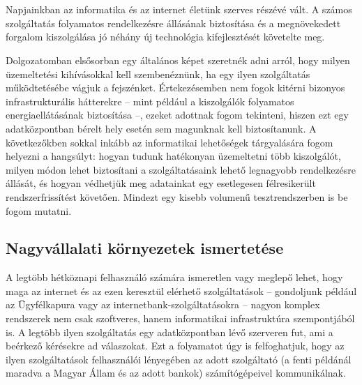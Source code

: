 \chapter{\bevezetes}

%

Napjainkban az informatika és az internet életünk szerves részévé vált. A számos szolgáltatás folyamatos rendelkezésre állásának biztosítása és a megnövekedett forgalom kiszolgálása jó néhány új technológia kifejlesztését követelte meg.

Dolgozatomban elsősorban egy általános képet szeretnék adni arról, hogy milyen üzemeltetési kihívásokkal kell szembenéznünk, ha egy ilyen szolgáltatás működtetésébe vágjuk a fejszénket. Értekezésemben nem fogok kitérni bizonyos infrastrukturális hátterekre -- mint például a kiszolgálók folyamatos energiaellátásának biztosítása --, ezeket adottnak fogom tekinteni, hiszen ezt egy adatközpontban bérelt hely esetén sem magunknak kell biztosítanunk. A következőkben sokkal inkább az informatikai lehetőségek tárgyalására fogom helyezni a hangsúlyt: hogyan tudunk hatékonyan üzemeltetni több kiszolgálót, milyen módon lehet biztosítani a szolgáltatásaink lehető legnagyobb rendelkezésre állását, és hogyan védhetjük meg adatainkat egy esetlegesen félresikerült rendszerfrissítést követően. Mindezt egy kisebb volumenű tesztrendszerben is be fogom mutatni.

\section{Nagyvállalati környezetek ismertetése}
A legtöbb hétköznapi felhasználó számára ismeretlen vagy meglepő lehet, hogy maga az internet és az ezen keresztül elérhető szolgáltatások -- gondoljunk például az Ügyfélkapura vagy az internetbank-szolgáltatásokra -- nagyon komplex rendszerek nem csak szoftveres, hanem informatikai infrastruktúra szempontjából is. A legtöbb ilyen szolgáltatás egy adatközpontban lévő szerveren fut, ami a beérkező kérésekre ad válaszokat. Ezt a folyamatot úgy is felfoghatjuk, hogy az ilyen szolgáltatások felhasználói lényegében az adott szolgáltató (a fenti példánál maradva a Magyar Állam és az adott bankok) számítógépeivel kommunikálnak.

